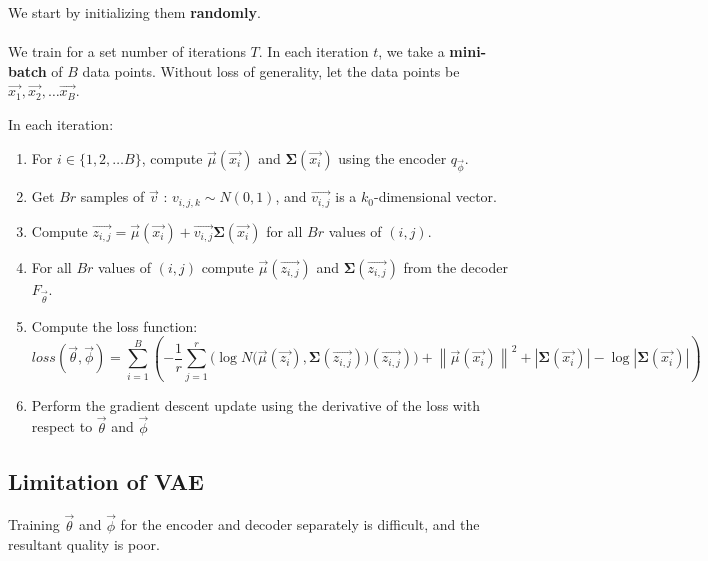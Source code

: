 \documentclass[a4paper]{article}
\begin{document}
We start by initializing them \textbf{randomly}. \\ \\
We train for a set number of iterations $T$. In each iteration $t$, we take a \textbf{mini-batch} of $B$ data points. Without loss of generality, let the data points be $\vec{x_1}, \vec{x_2}, \dots \vec{x_B}$.

In each iteration: 
\begin{enumerate}
    \item For $i \in \{1, 2, \dots B\}$, compute $\vec{\mu}(\vec{x_i})$ and $\mathbf{\Sigma}(\vec{x_i})$ using the encoder $q_{\vec{\phi}}$.
    \item Get $Br$ samples of $\vec{v}$ : $v_{i, j, k} \sim N(0, 1)$, and $\vec{v_{i, j}}$ is a $k_0$-dimensional vector.
    \item Compute $\vec{z_{i, j}} = \vec{\mu}(\vec{x_i}) + \vec{v_{i, j}}\mathbf{\Sigma}(\vec{x_i}) $ for all $Br$ values of $(i, j)$.
    \item For all $Br$ values of $(i, j)$ compute $\vec{\mu}(\vec{z_{i, j}})$ and $\mathbf{\Sigma}(\vec{z_{i, j}})$ from the decoder $F_{\vec{\theta}}$.
    \item Compute the loss function: 
    \[
        loss\left(\vec{\theta}, \vec{\phi}\right) = \sum_{i=1}^{B}\left( 
        - \frac{1}{r}\sum_{j=1}^{r} \Big(\log N\big( \vec{\mu}(\vec{z_i}), \mathbf{\Sigma}(\vec{z_{i,j}}) \big)(\vec{z_{i,j}})\Big) + \left\| \vec{\mu}(\vec{x_i}) \right\|^2 + \left| \mathbf{\Sigma}(\vec{x_i}) \right| - \log \left| \mathbf{\Sigma}(\vec{x_i}) \right|
        \right)
    \]
    \item Perform the gradient descent update using the derivative of the loss with respect to $\vec{\theta}$ and $\vec{\phi}$
\end{enumerate}
\subsection{Limitation of VAE}
Training $\vec{\theta}$ and $\vec{\phi}$ for the encoder and decoder separately is difficult, and the resultant quality is poor.
\end{document}

